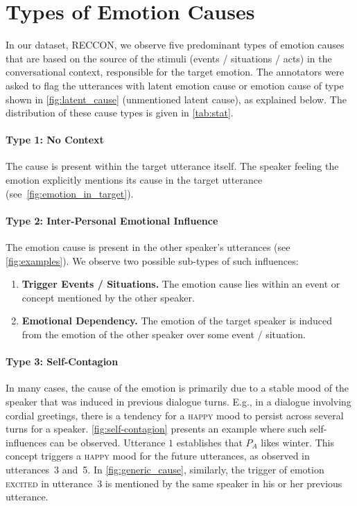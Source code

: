 \documentclass[smallextended]{svjour3}
\newcommand\emo[1]{\textsc{#1}}
\newcommand\RECCONDA{RECCON}
\newcommand\0{\hphantom{0}}
\begin{document}
\section{Types of Emotion Causes}
\label{sec:types}
In our dataset, \RECCONDA{}, we observe five predominant types of emotion causes that are based on the source of the stimuli (events / situations / acts) in the conversational context, responsible for the target emotion. 
The annotators were asked to flag the utterances with latent emotion cause or emotion cause of type 
shown in \cref{fig:latent_cause} (unmentioned latent cause),
as explained below.
The distribution of these cause types is given in \cref{tab:stat}.



\paragraph{Type 1: No Context} The cause is present within the target utterance itself. The speaker feeling the emotion explicitly mentions its cause in the target utterance (see~\cref{fig:emotion_in_target}).
 


\paragraph{Type 2: Inter-Personal Emotional Influence}
The emotion cause is present in the other speaker's utterances (see \cref{fig:examples}).
We observe two possible sub-types of such influences:
\begin{enumerate}[itemsep=0ex, leftmargin=*, label=2\alph*)]
    \item \textbf{Trigger Events / Situations.} The emotion cause lies within an event or concept mentioned by the other speaker.
    \item \textbf{Emotional Dependency.} The emotion of the target speaker is induced from the emotion of the other speaker over some event / situation.
\end{enumerate}

\paragraph{Type 3: Self-Contagion}
In many cases, 
the cause of the emotion is primarily due to a stable mood of the speaker that was induced in 
previous dialogue turns. 
E.g.,
in a dialogue involving cordial greetings, there is a tendency for a \emo{happy} mood to persist across several turns for a speaker. \cref{fig:self-contagion} presents an example where such self-influences can be observed. Utterance $1$ establishes that $P_A$ likes winter. This concept triggers a \emo{happy} mood for the future utterances, as observed in utterances~3 and~5. In \cref{fig:generic_cause}, similarly, the trigger of emotion \emo{excited} in utterance~3 is mentioned by the same speaker in his or her previous utterance.
\end{document}
